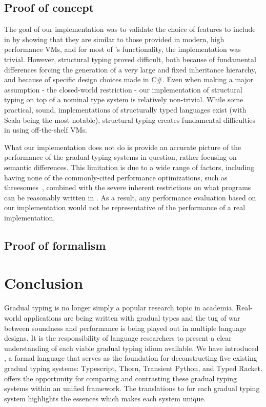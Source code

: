 \documentclass[acmlarge, anonymous, authordraft]{acmart}
\begin{document}
\subsection{Proof of concept}

The goal of our implementation was to validate the choice of features to
include in \kafka by showing that they are similar to those provided in
modern, high performance VMs, and for most of \kafka's functionality, the
implementation was trivial. However, structural typing proved difficult, both
because of fundamental differences forcing the generation of a very large and
fixed inheritance hierarchy, and because of specific design choices made in
C\#. Even when making a major assumption - the closed-world restriction - our
implementation of structural typing on top of a nominal type system is
relatively non-trivial. While some practical, sound, implementations of
structurally typed languages exist (with Scala being the most notable),
structural typing creates fundamental difficulties in using off-the-shelf VMs.

What our implementation does not do is provide an accurate picture of the
performance of the gradual typing systems in question, rather focusing on
semantic differences. This limitation is due to a wide range of factors,
including having none of the commonly-cited performance optimizations, such as
threesomes~\cite{siek10}, combined with the severe inherent restrictions on
what programs can be reasonably written in \kafka. As a result, any
performance evaluation based on our \kafka implementation would not be
representative of the performance of a real implementation. %

\subsection{Proof of formalism}

\section{Conclusion}

Gradual typing is no longer simply a popular research topic in academia.
Real-world applications are being written with gradual types and the tug of
war between soundness and performance is being played out in multiple
language designs.  It is the responsibility of language researchers to
present a clear understanding of each viable gradual typing idiom available.
We have introduced \kafka, a formal language that serves as the foundation
for deconstructing five existing gradual typing systems: Typescript, Thorn,
Transient Python, and Typed Racket.
\kafka offers the
opportunity for comparing and contrasting these gradual typing systems
within an unified framework. The translations to \kafka for each gradual
typing system highlights the essences which makes each system unique.
\end{document}

